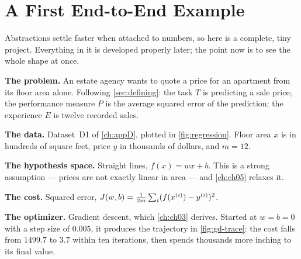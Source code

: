 \section{A First End-to-End Example}
\label{sec:end-to-end}

Abstractions settle faster when attached to numbers, so here is a complete, tiny
project. Everything in it is developed properly later; the point now is to see
the whole shape at once.

\textbf{The problem.} An estate agency wants to quote a price for an apartment
from its floor area alone. Following \cref{sec:defining}: the task $T$ is
predicting a sale price; the performance measure $P$ is the average squared
error of the prediction; the experience $E$ is twelve recorded sales.

\textbf{The data.} Dataset~D1 of \cref{ch:appD}, plotted in
\cref{fig:regression}. Floor area $x$ is in hundreds of square feet, price $y$
in thousands of dollars, and $m=12$.

\textbf{The hypothesis space.} Straight lines, $f(x)=wx+b$. This is a strong
assumption --- prices are not exactly linear in area --- and \cref{ch:ch05}
relaxes it.

\textbf{The cost.} Squared error, $J(w,b)=\frac{1}{2m}\sum_i (f(x^{(i)})-y^{(i)})^2$.

\textbf{The optimizer.} Gradient descent, which \cref{ch:ch03} derives. Started
at $w=b=0$ with a step size of $0.005$, it produces the trajectory in
\cref{fig:gd-trace}: the cost falls from $1499.7$ to $3.7$ within ten
iterations, then spends thousands more inching to its final value.

